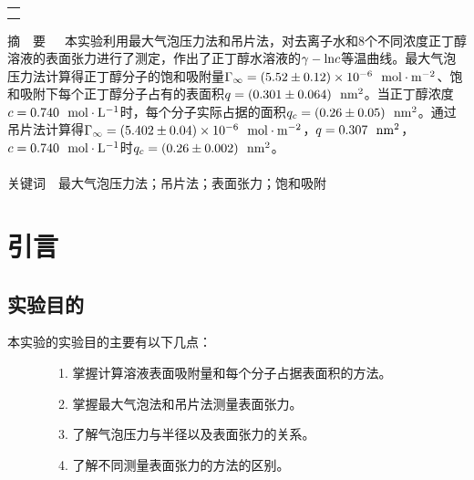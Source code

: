 \documentclass[12pt]{article}
\begin{document}
\begin{titlepage}
\begin{center}
            \begin{tabular*}{\textwidth}{c}
                \\ %
                \\ %
                \\ %
                \hline %
            \end{tabular*}
        \end{center}
        \textsf{\textcolor{BrickRed}{摘\ \ 要}}\ \  \  本实验利用最大气泡压力法和吊片法，对去离子水和8个不同浓度正丁醇溶液的表面张力进行了测定，作出了正丁醇水溶液的$\gamma-{\rm ln}c$等温曲线。最大气泡压力法计算得正丁醇分子的饱和吸附量$\Gamma_{\infty}=(5.52\pm 0.12)\times 10^{-6}\ \ {\rm mol\cdot m^{-2}}$、饱和吸附下每个正丁醇分子占有的表面积$q=(0.301\pm 0.064)\ \ {\rm nm^{2}}$。当正丁醇浓度$c=0.740\ \ {\rm mol\cdot L^{-1}}$时，每个分子实际占据的面积$q_{c}=(0.26\pm 0.05)\ \ {\rm nm^{2}}$。通过吊片法计算得$\Gamma_{\infty}=(5.402\pm 0.04)\times10^{-6}\ \ {\rm mol\cdot m^{-2}}$，$q=0.307\ \ {\rm nm^{2}}$，$c=0.740\ \ {\rm mol\cdot L^{-1}}$时$q_{c}=(0.26\pm 0.002)\ \ {\rm nm^{2}}$。
        \\
        \\
        \textsf{\textcolor{BrickRed}{关键词}}\ \ 最大气泡压力法；吊片法；表面张力；饱和吸附
    \end{titlepage}

    \section{引言}
		\subsection{实验目的}
			本实验的实验目的主要有以下几点\citealp{physchemlab}：\par
			\ \ \ \ \ \ \ \ 1. 掌握计算溶液表面吸附量和每个分子占据表面积的方法。\par
			\ \ \ \ \ \ \ \	2. 掌握最大气泡法和吊片法测量表面张力。\par
			\ \ \ \ \ \ \ \	3. 了解气泡压力与半径以及表面张力的关系。\par
			\ \ \ \ \ \ \ \	4. 了解不同测量表面张力的方法的区别。\par

		\par
\end{document}
